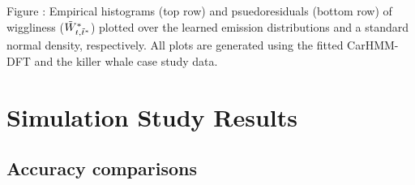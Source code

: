\documentclass{article}
\begin{document}
        \noindent Figure : Empirical histograms (top row) and psuedoresiduals (bottom row) of wiggliness ($\tilde{W}^*_{t,\tilde t^*}$) plotted over the learned emission distributions and a standard normal density, respectively. All plots are generated using the fitted CarHMM-DFT and the killer whale case study data.
        \addtocounter{fignum}{1}


\newpage
\section{Simulation Study Results}

    \subsection{Accuracy comparisons}
        
\end{document}
